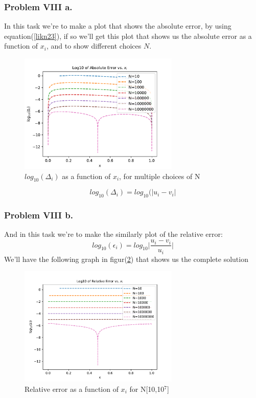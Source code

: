 \documentclass{article}
\begin{document}
\subsubsection*{Problem VIII a.}
In this task we're to make a plot that shows the absolute error, by using equation(\ref{likn23}), if so we'll get this plot that shows us the absolute error as a function of $x_i$, and to show different choices $N$. 
\begin{figure}[h!]
    \centering
    \includegraphics[width=3in]{Problem8/logAbsError_plot.pdf}
    \caption{$log_{10}(\Delta_i)$ as a function of $x_i$, for multiple choices of N}
    \label{fig2}
\end{figure}
\begin{equation}\label{likn23}
    log_{10}(\Delta_i)= log_{10}(|u_i-v_i|
\end{equation}


\subsubsection*{Problem VIII b.} And in this task we're to make the similarly plot of the relative error:
\begin{equation*}
    log_{10}(\epsilon_i)= log_{10}\Big|\frac{u_i-v_i}{u_i}\Big|
\end{equation*}
We'll have the following graph in figur(\ref{fig3}) that shows us the complete solution

\begin{figure}[h!]
    \centering
    \includegraphics[width=3in]{Problem8/logRelError_plot.pdf}
    \caption{Relative error as a function of $x_i$ for N[10,10$^7$]}
    \label{fig3}
\end{figure}
\pagebreak
\end{document}
